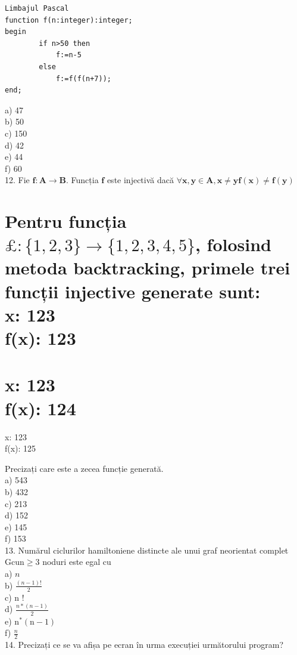 \documentclass[10pt]{article}
\begin{document}
\begin{verbatim}
Limbajul Pascal
function f(n:integer):integer;
begin
        if n>50 then
            f:=n-5
        else
            f:=f(f(n+7));
end;
\end{verbatim}

a) 47\\
b) 50\\
c) 150\\
d) 42\\
e) 44\\
f) 60\\
12. Fie $\mathbf{f}: \mathbf{A} \rightarrow \mathbf{B}$. Funcția $\mathbf{f}$ este injectivă dacă $\forall \mathbf{x}, \mathbf{y} \in \mathbf{A}, \mathbf{x} \neq \mathbf{y} \mathbf{f}(\mathbf{x}) \neq \boldsymbol{f}(\mathbf{y})$

\section*{Pentru funcția $\pounds:\{1,2,3\} \rightarrow\{1,2,3,4,5\}$, folosind metoda backtracking, primele trei funcții injective generate sunt:\\
x: 123\\
f(x): 123}
\section*{x: 123\\
f(x): 124}
x: 123\\
f(x): 125

Precizați care este a zecea funcție generată.\\
a) 543\\
b) 432\\
c) 213\\
d) 152\\
e) 145\\
f) 153\\
13. Numărul ciclurilor hamiltoniene distincte ale unui graf neorientat complet $\mathrm{G} \mathrm{cu} \mathrm{n} \geq 3$ noduri este egal cu\\
a) $n$\\
b) $\frac{(n-1)!}{2}$\\
c) n !\\
d) $\frac{n *(n-1)}{2}$\\
e) $\mathrm{n}^{*}(\mathrm{n}-1)$\\
f) $\frac{n}{2}$\\
14. Precizați ce se va afișa pe ecran în urma execuției următorului program?
\end{document}
